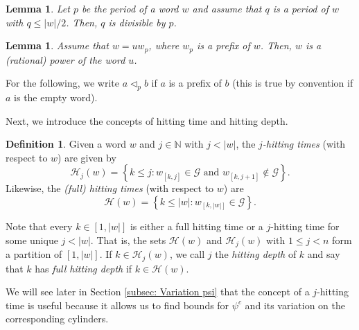 \documentclass[11pt,reqno]{amsart}
\theoremstyle{plain}
\newtheorem{lemma}[theorem]{Lemma}
\theoremstyle{definition}
\newtheorem{definition}[theorem]{Definition}
\newcommand{\N}{{\mathbb N}}
\newcommand{\mc}{\mathcal}
\begin{document}
\begin{lemma}
\label{LEM:period-division}
Let $p$ be the period of a word $w$ and assume that $q$ is a period of $w$ with $q \leqslant |w|/2$. Then, $q$ is divisible by $p$.
\end{lemma}


\begin{lemma}
\label{LEM:word-power}
Assume that $w = u w_p$, where $w_p$ is a prefix of $w$. Then, $w$ is a (rational) power of the word $u$.
\end{lemma}

For the following, we write $a \triangleleft_p b$ if $a$ is a prefix of $b$ (this is true by convention if $a$ is the empty word).

Next, we introduce the concepts of hitting time and hitting depth.




\begin{definition}
Given a word $w$ and $j \in \N$ with $j < |w|$, the \emph{$j$-hitting times} (with respect to $w$) are given by
\[
\mc H_j(w) = \left\{ k \leqslant j: w_{[k,j]} \in \mc G \mbox{ and } w_{[k,j+1]} \notin \mc G \right\}.
\]
Likewise, the \emph{(full) hitting times} (with respect to $w$) are
\[
\mc H(w) = \left\{ k \leqslant |w|: w_{[k,|w|]} \in \mc G \right\}.
\]
\end{definition}
Note that every $k \in [1,|w|]$ is either a full hitting time or a $j$-hitting time for some unique $j < |w|$. That is, the sets $\mc H(w)$ and $\mc H_j(w)$ with $1\leqslant j < n$ form a partition of $[1,|w|]$.
If $k \in \mc H_j(w)$, we call $j$ the \emph{hitting depth} of $k$ and say that $k$ has \emph{full hitting depth} if $k \in \mc H(w)$.

We will see later in Section \ref{subsec: Variation psi} that the concept of a $j$-hitting time is useful because it allows us to find bounds for $\psi^c$ and its variation on the corresponding cylinders.
\end{document}
